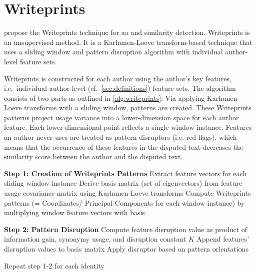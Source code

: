 \newcommand{\writeprints}{Writeprints}
\section{\writeprints{}}
\label{sec:writeprints}

\citet{abbasi_writeprints_2008} propose the \writeprints{} technique for \ac{aa} and similarity detection.
\writeprints{} is an unsupervised method. %
It is a Karhunen-Loeve transform-based technique that uses a sliding window and 
pattern disruption algorithm with individual author-level feature sets.

\writeprints{} is constructed for each author using the author's key features, 
i.e.\ individual-author-level (cf.~\autoref{sec:definitions}) feature sets.
The algorithm consists of two parts as outlined in \autoref{alg:writeprints}:
Via applying Karhunen-Loeve transforms with a sliding window, patterns are created.
These \writeprints{} patterns project usage variance into a lower-dimension space for each author feature.
Each lower-dimensional point reflects a single window instance.
Features an author never uses are treated as pattern disruptors (i.e. red flags), 
which means that the occurrence of these features in the disputed text decreases the similarity score 
between the author and the disputed text.

\begin{algorithm}
\caption{Writeprints Steps}
\label{alg:writeprints}
\begin{algorithmic}[1]

        \State \textbf{Step 1: Creation of \writeprints{} Patterns}
            
            \State Extract feature vectors for each sliding window instance 
            \State Derive basis matrix (set of eigenvectors) from feature usage covariance matrix using Karhunen-Loeve transforms 
            \State Compute \writeprints{} patterns (= Coordinates/ Principal Components for each window instance) by multiplying window feature vectors with basis
        \EndFor
       

        \State \textbf{Step 2: Pattern Disruption}  
         
            \State Compute feature disruption value as product of information gain, synonymy usage, and disruption constant $K$
            \State Append features' disruption values to basis matrix
            \State Apply disruptor based on pattern orientations
          
        \EndFor

        \State Repeat step 1-2 for each identity
    \EndProcedure
\end{algorithmic}
\end{algorithm}



